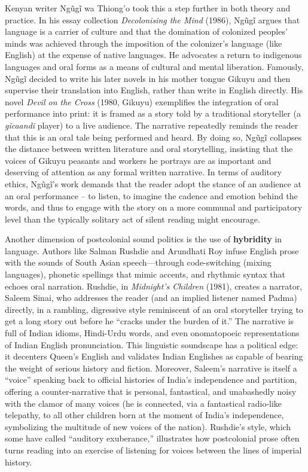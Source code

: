 \documentclass[12pt]{report}
\begin{document}
Kenyan writer Ngũgĩ wa Thiong’o took this a step further in both theory and practice. In his essay collection \textit{Decolonising the Mind} (1986), Ngũgĩ argues that language is a carrier of culture and that the domination of colonized peoples’ minds was achieved through the imposition of the colonizer’s language (like English) at the expense of native languages. He advocates a return to indigenous languages and oral forms as a means of cultural and mental liberation. Famously, Ngũgĩ decided to write his later novels in his mother tongue Gikuyu and then supervise their translation into English, rather than write in English directly. His novel \textit{Devil on the Cross} (1980, Gikuyu) exemplifies the integration of oral performance into print: it is framed as a story told by a traditional storyteller (a \textit{gĩcaandĩ} player) to a live audience. The narrative repeatedly reminds the reader that this is an oral tale being performed and heard. By doing so, Ngũgĩ collapses the distance between written literature and oral storytelling, insisting that the voices of Gikuyu peasants and workers he portrays are as important and deserving of attention as any formal written narrative. In terms of auditory ethics, Ngũgĩ’s work demands that the reader adopt the stance of an audience at an oral performance – to listen, to imagine the cadence and emotion behind the words, and thus to engage with the story on a more communal and participatory level than the typically solitary act of silent reading might encourage.

Another dimension of postcolonial sound politics is the use of \textbf{hybridity} in language. Authors like Salman Rushdie and Arundhati Roy infuse English prose with the sounds of South Asian speech—through code-switching (mixing languages), phonetic spellings that mimic accents, and rhythmic syntax that echoes oral narration. Rushdie, in \textit{Midnight’s Children} (1981), creates a narrator, Saleem Sinai, who addresses the reader (and an implied listener named Padma) directly, in a rambling, digressive style reminiscent of an oral storyteller trying to get a long story out before he “cracks under the burden of it.” The narrative is full of Indian idioms, Hindi-Urdu words, and even onomatopoeic representations of Indian English pronunciation. This linguistic soundscape has a political edge: it decenters Queen’s English and validates Indian Englishes as capable of bearing the weight of serious history and fiction. Moreover, Saleem’s narrative is itself a “voice” speaking back to official histories of India’s independence and partition, offering a counter-narrative that is personal, fantastical, and unabashedly noisy with the clamor of many voices (he is connected, via a fantastical radio-like telepathy, to all other children born at the moment of India’s independence, symbolizing the multitude of new voices of the nation). Rushdie’s style, which some have called “auditory exuberance,” illustrates how postcolonial prose often turns reading into an exercise of listening for voices between the lines of imperial history.
\end{document}
